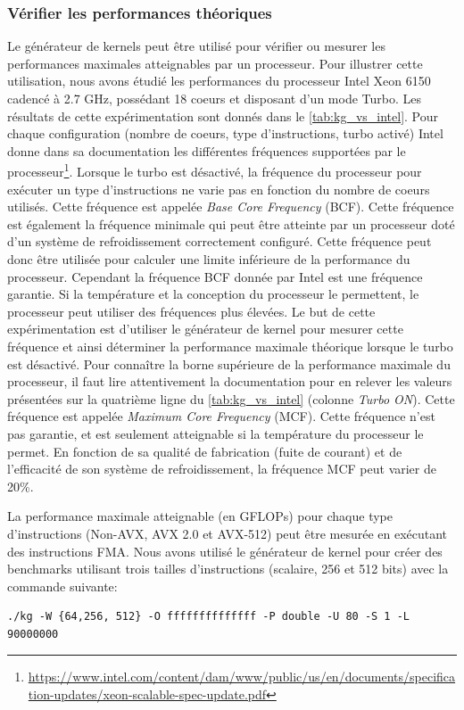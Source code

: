     \subsubsection{Vérifier les performances théoriques}
    Le générateur de kernels peut être utilisé pour vérifier ou mesurer les performances maximales atteignables par un processeur. Pour illustrer cette utilisation, nous avons étudié les performances du processeur Intel Xeon 6150 cadencé à 2.7 GHz, possédant 18 coeurs et disposant d'un mode Turbo. Les résultats de cette expérimentation sont donnés dans le \autoref{tab:kg_vs_intel}. Pour chaque configuration (nombre de coeurs, type d'instructions, turbo activé) Intel donne dans sa documentation les différentes fréquences supportées par le processeur\footnote{\url{https://www.intel.com/content/dam/www/public/us/en/documents/specification-updates/xeon-scalable-spec-update.pdf}}. Lorsque le turbo est désactivé, la fréquence du processeur pour exécuter un type d'instructions ne varie pas en fonction du nombre de coeurs utilisés. Cette fréquence est appelée \textit{Base Core Frequency} (BCF). Cette fréquence est également la fréquence minimale qui peut être atteinte par un processeur doté d'un système de refroidissement correctement configuré. Cette fréquence peut donc être utilisée pour calculer une limite inférieure de la performance du processeur. Cependant la fréquence BCF donnée par Intel est une fréquence garantie. Si la température et la conception du processeur le permettent, le processeur peut utiliser des fréquences plus élevées. Le but de cette expérimentation est d'utiliser le générateur de kernel pour mesurer cette fréquence et ainsi déterminer la performance maximale théorique lorsque le turbo est désactivé. 
    Pour connaître la borne supérieure de la performance maximale du processeur, il faut lire attentivement la documentation pour en relever les valeurs présentées sur la quatrième ligne du \autoref{tab:kg_vs_intel} (colonne \textit{Turbo ON}). Cette fréquence est appelée \textit{Maximum Core Frequency} (MCF). Cette fréquence n'est pas garantie, et est seulement atteignable si la température du processeur le permet. En fonction de sa qualité de fabrication (fuite de courant) et de l'efficacité de son système de refroidissement, la fréquence MCF peut varier de 20\%.  

    
    La performance maximale atteignable (en GFLOPs) pour chaque type d'instructions (Non-AVX, AVX 2.0 et AVX-512) peut être mesurée en exécutant des instructions \gls{FMA}. Nous avons utilisé le générateur de kernel pour créer des benchmarks utilisant trois tailles d'instructions (scalaire, 256 et 512 bits) avec la commande suivante:
\begin{lstlisting}
./kg -W {64,256, 512} -O ffffffffffffff -P double -U 80 -S 1 -L 90000000
\end{lstlisting}


